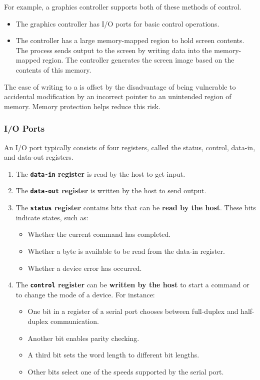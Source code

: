 For example, a graphics controller supports both of these methods of control.
\begin{itemize}[noitemsep]
\item The graphics controller has I/O ports for basic control operations.
\item The controller has a large memory-mapped region to hold screen contents.
  The process sends output to the screen by writing data into the memory-mapped region.
  The controller generates the screen image based on the contents of this memory.
\end{itemize}

The ease of writing to a   is offset by the disadvantage of being vulnerable to accidental modification by an incorrect pointer to an unintended region of memory.
Memory protection helps reduce this risk.

\subsubsection{I/O Ports}\label{subsubsec:IO_Ports}
An I/O port typically consists of four registers, called the status, control, data-in, and data-out registers.
\begin{enumerate}[noitemsep]
\item The \textbf{\texttt{data-in} register} is read by the host to get input.
\item The \textbf{\texttt{data-out} register} is written by the host to send output.
\item The \textbf{\texttt{status} register} contains bits that can be \textbf{read by the host}.
  These bits indicate states, such as:
  \begin{itemize}[noitemsep]
  \item Whether the current command has completed.
  \item Whether a byte is available to be read from the data-in register.
  \item Whether a device error has occurred.
  \end{itemize}

\item The \textbf{\texttt{control} register} can be \textbf{written by the host} to start a command or to change the mode of a device.
  For instance:
  \begin{itemize}[noitemsep]
  \item One bit in a register of a serial port chooses between full-duplex and half-duplex communication.
  \item Another bit enables parity checking.
  \item A third bit sets the word length to different bit lengths.
  \item Other bits select one of the speeds supported by the serial port.
  \end{itemize}
\end{enumerate}

